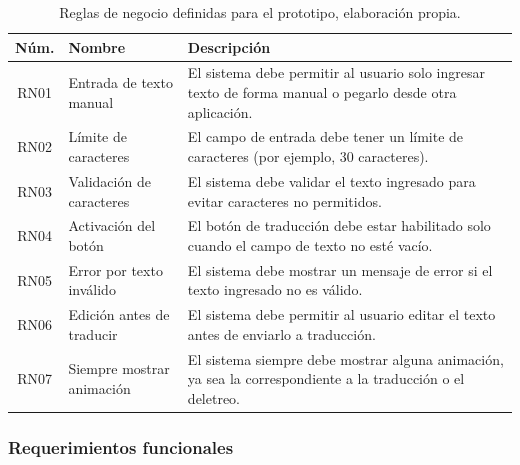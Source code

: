 \begin{table}[H]
	\centering
	\renewcommand{\arraystretch}{1.5}
	\setlength{\tabcolsep}{5pt}
	\begin{adjustbox}{max width=\linewidth}
		\normalsize
		\begin{tabular}{|c|p{4.5cm}|p{9cm}|}
			\hline
			\textbf{Núm.} & \textbf{Nombre} & \textbf{Descripción} \\ \hline
			
			RN01 & Entrada de texto manual & El sistema debe permitir al usuario solo ingresar texto de forma manual o pegarlo desde otra aplicación. \\ \hline
			
			RN02 & Límite de caracteres & El campo de entrada debe tener un límite de caracteres (por ejemplo, 30 caracteres). \\ \hline
			
			RN03 & Validación de caracteres & El sistema debe validar el texto ingresado para evitar caracteres no permitidos. \\ \hline
			
			RN04 & Activación del botón & El botón de traducción debe estar habilitado solo cuando el campo de texto no esté vacío. \\ \hline
			
			RN05 & Error por texto inválido & El sistema debe mostrar un mensaje de error si el texto ingresado no es válido. \\ \hline
			
			RN06 & Edición antes de traducir & El sistema debe permitir al usuario editar el texto antes de enviarlo a traducción. \\ \hline
			
			RN07 & Siempre mostrar animación & El sistema siempre debe mostrar alguna animación, ya sea la correspondiente a la traducción o el deletreo. \\ \hline
			
		\end{tabular}
	\end{adjustbox}
	\caption[Reglas de negocio del prototipo]{Reglas de negocio definidas para el prototipo, elaboración propia.}
	\label{tab:reglas_negocio}
\end{table}

\subsubsection{Requerimientos funcionales}

